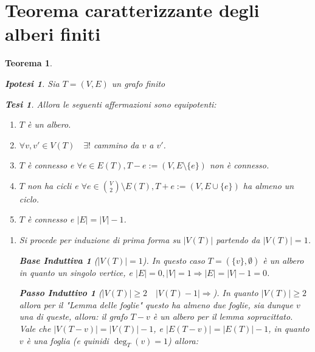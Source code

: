 \documentclass{article}
\makeatletter
\renewenvironment{proof}[1][\proofname]{\par
    \pushQED{\qed}%
    \normalfont \topsep6\p@\@plus6\p@\relax
    \trivlist
    \item\relax
    {\itshape
    #1\@addpunct{.}}\hspace\labelsep\ignorespaces
    }{%
    \popQED\endtrivlist\@endpefalse
}
\newtheorem{theorem}{Teorema}[part]
\newtheorem{ipothesis}[lemma]{Ipotesi}
\newtheorem{thesis}[lemma]{Tesi}
\theoremstyle{definition}
\newtheorem*{base}{Base Induttiva}
\newtheorem*{step}{Passo Induttivo}
\makeatother
\begin{document}
    \section{Teorema caratterizzante degli alberi finiti}
        \begin{theorem}
            \begin{ipothesis}
                Sia \(T=(V,E)\) un grafo finito
            \end{ipothesis}
            \begin{thesis}
                Allora le seguenti affermazioni sono equipotenti:
                \begin{enumerate}
                    \item \(T\) è un albero.
                    \item \(\forall v,v' \in V(T)\quad\exists!\) cammino da \(v\) a \(v'\).
                    \item \(T\) è connesso e \(\forall e\in E(T), T-e:=(V,E\setminus\{e\})\) non è connesso.
                    \item \(T\) non ha cicli e \(\forall e\in \binom{V}{2}\setminus E(T), T+e:=(V,E\cup\{e\})\) ha almeno un ciclo.
                    \item \(T\) è connesso e \(|E|=|V|-1\).
                \end{enumerate}
            \end{thesis}
            \begin{proof}
                \begin{enumerate}
                    \item[$1\Rightarrow 5$)] Si procede per induzione di prima forma su \(|V(T)|\) partendo da \(|V(T)|=1\).
                        \begin{base}[$|V(T)|=1$]
                            In questo caso \(T=(\{v\},\emptyset)\) è un albero in quanto un singolo vertice, e \(|E|=0,|V|=1\Rightarrow |E|=|V|-1=0\).
                            \checkmark\end{base}
                        \begin{step}[$|V(T)|\geq2\quad |V(T)-1|\Longrightarrow$]
                            In quanto \(|V(T)|\geq 2\) allora per il "Lemma delle foglie" questo ha almeno due foglie, sia dunque \(v\) una di queste, allora:
                            il grafo \(T-v\) è un albero per il lemma sopracittato. Vale che \(|V(T-v)|=|V(T)|-1\), e \(|E(T-v)|=|E(T)|-1\), in quanto \(v\) è una foglia (e quinidi \(\deg_T(v)=1\)) allora: \[
                                \begin{aligned}

\end{aligned}\]
\end{step}
\end{enumerate}
\end{proof}
\end{theorem}
\end{document}
